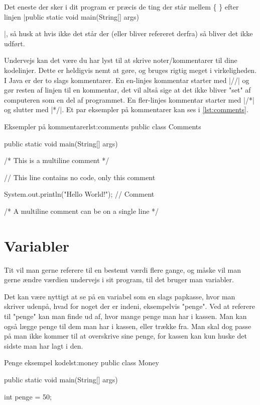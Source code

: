 Det eneste der sker i dit program er præcis de ting der står mellem \{ \} efter linjen \JavaInline|public static void main(String[] args) {|, så husk at hvis ikke det står der (eller bliver refereret derfra) så bliver det ikke udført.

\begin{remark}
	Undervejs kan det være du har lyst til at skrive noter/kommentarer til dine kodelinjer. Dette er heldigvis nemt at gøre, og bruges rigtig meget i virkeligheden. I Java er der to slags kommentarer. En en-linjes kommentar starter med \JavaInline|//| og gør resten af linjen til en kommentar, det vil altså sige at det ikke bliver "set" af computeren som en del af programmet. En fler-linjes kommentar starter med \JavaInline|/*| og slutter med \JavaInline|*/|. Et par eksempler på kommentarer kan ses i \autoref{lst:comments}.
\end{remark}

\begin{JavaCode}{Eksempler på kommentarer}{lst:comments}
	public class Comments {
		public static void main(String[] args) {
			/*
			This 
			is
			a 
			multiline 
			comment
			*/
			
			// This line contains no code, only this comment
			
			System.out.println("Hello World!");	// Comment
			
			/* A multiline comment can be on a single line */
		}
	}
\end{JavaCode}

\section{Variabler}
Tit vil man gerne referere til en bestemt værdi flere gange, og måske vil man gerne ændre værdien undervejs i sit program, til det bruger man variabler. 

Det kan være nyttigt at se på en variabel som en slags papkasse, hvor man skriver udenpå, hvad for noget der er indeni, eksempelvis "penge". Ved at referere til "penge" kan man finde ud af, hvor mange penge man har i kassen. Man kan også lægge penge til dem man har i kassen, eller trække fra. Man skal dog passe på man ikke kommer til at overskrive sine penge, for kassen kan kun huske det sidste man har lagt i den.

\begin{JavaCode}{Penge eksempel kode}{lst:money}
public class Money {
	public static void main(String[] args) {
		int penge = 50;
		
}}
\end{JavaCode}}
